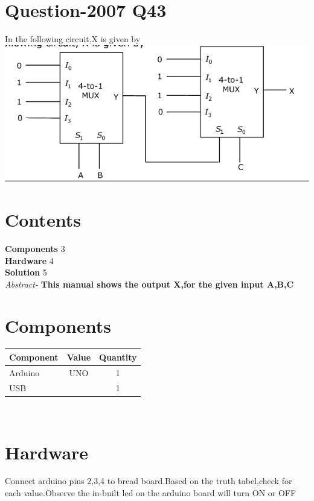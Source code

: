 \documentclass[10pt]{report}
\begin{document}
\begin{multicols}{2} 
\section{Question-2007  Q43}
In the following circuit,X is given by
\includegraphics[scale=0.40]{mux.png}
\section{Contents}
\raggedright
\textbf{Components}\hspace{4.35cm} 3
\\\textbf{Hardware}\hspace{4.78cm}   4
\\\textbf{Solution}
\hspace{4.95cm}   5\\
\vspace{1cm}
\textit{Abstract-}
\textbf{This manual shows the output X,for the given input A,B,C}
\section{Components}
\centering
\begin{tabular}{|l|c|c|}
\hline
Component & Value & Quantity\\
\hline
Arduino & UNO & 1\\
\hline
USB & & 1\\
\hline
\end{tabular}\\
\section{Hardware}
\raggedright Connect arduino pins 2,3,4 to bread board.Based on the truth tabel,check for each value.Observe the in-built led on the arduino board will turn ON or OFF \\
\centering

\end{multicols}
\end{document}
